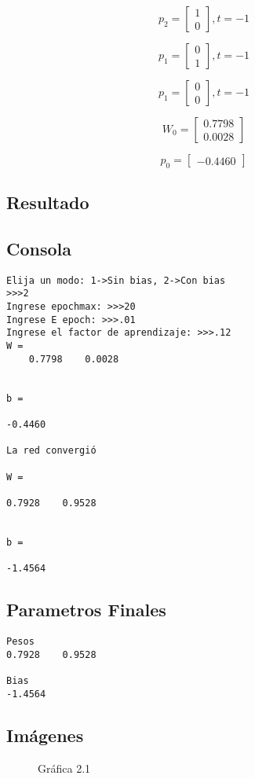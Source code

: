 \documentclass{article}
\begin{document}
\[p_2=
\begin{bmatrix}
1\\
0
\end{bmatrix}
,t = -1
\]

\[p_1=
\begin{bmatrix}
0\\
1
\end{bmatrix}
,t = -1
\]

\[p_1=
\begin{bmatrix}
0\\
0
\end{bmatrix}
,t = -1
\]

\[W_0=
\begin{bmatrix}
0.7798\\
0.0028
\end{bmatrix}
\]

\[p_0=
\begin{bmatrix}
-0.4460
\end{bmatrix}
\]
\subsection{Resultado}
\subsection{Consola}
\begin{lstlisting}
Elija un modo: 1->Sin bias, 2->Con bias
>>>2
Ingrese epochmax: >>>20
Ingrese E epoch: >>>.01
Ingrese el factor de aprendizaje: >>>.12
W =
	0.7798    0.0028


b =

-0.4460

La red convergió

W =

0.7928    0.9528


b =

-1.4564
\end{lstlisting}
\subsection{Parametros Finales}
\begin{lstlisting}
Pesos
0.7928    0.9528

Bias
-1.4564
\end{lstlisting}
\subsection{Imágenes}
\begin{figure}[htpb]
	\centering
	
	\caption{Gráfica 2.1}
\end{figure}
\end{document}
